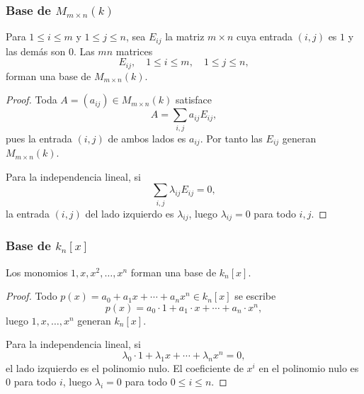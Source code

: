 \begin{frame}[allowframebreaks, t]
    \frametitle{Base de \(M_{m\times n}(k)\)}

    \begin{proposition}
        Para \(1\leq i\leq m\) y \(1\leq j\leq n\), sea \(E_{ij}\) la matriz
        \(m\times n\) cuya entrada \((i,j)\) es \(1\) y las demás son \(0\).
        Las \(mn\) matrices
        \[
            E_{ij},\quad 1\leq i\leq m,\quad 1\leq j\leq n,
        \]
        forman una base de \(M_{m\times n}(k)\).
    \end{proposition}

    \begin{proof}
        Toda \(A=(a_{ij})\in M_{m\times n}(k)\) satisface
        \[
            A=\sum_{i,j}a_{ij}E_{ij},
        \]
        pues la entrada \((i,j)\) de ambos lados es \(a_{ij}\).
        Por tanto las \(E_{ij}\) \alert{generan} \(M_{m\times n}(k)\).

        Para la \alert{independencia lineal}, si
        \[
            \sum_{i,j}\lambda_{ij}E_{ij}=0,
        \]
        la entrada \((i,j)\) del lado izquierdo es \(\lambda_{ij}\),
        luego \(\lambda_{ij}=0\) para todo \(i,j\).
    \end{proof}
\end{frame}


\begin{frame}
    \frametitle{Base de \(k_n[x]\)}

    \begin{proposition}
        Los monomios \(1,x,x^2,\ldots,x^n\) forman una base de \(k_n[x]\).
    \end{proposition}

    \begin{proof}
        Todo \(p(x)=a_0+a_1x+\cdots+a_nx^n\in k_n[x]\) se escribe
        \[
            p(x)=a_0\cdot1+a_1\cdot x+\cdots+a_n\cdot x^n,
        \]
        luego \(1,x,\ldots,x^n\) \alert{generan} \(k_n[x]\).

        Para la \alert{independencia lineal}, si
        \[
            \lambda_0\cdot1+\lambda_1 x+\cdots+\lambda_n x^n=0,
        \]
        el lado izquierdo es el polinomio nulo. El coeficiente de
        \(x^i\) en el polinomio nulo es \(0\) para todo \(i\),
        luego \(\lambda_i=0\) para todo \(0\leq i\leq n\).
    \end{proof}
\end{frame}


